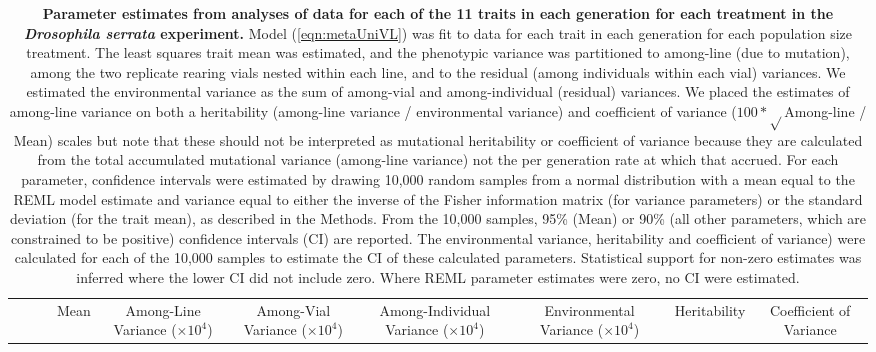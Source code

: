 \newpage
\FloatBarrier
\begin{landscape}
\begin{table}[!ht]
    \setlength\tabcolsep{0.3em}
    \tiny
    \caption[Parameter estimates from analyses of data for each of the 11 traits in each generation for each treatment in the \textit{Drosophila serrata} experiment.]{\textbf{Parameter estimates from analyses of data for each of the 11 traits in each generation for each treatment in the \textit{Drosophila serrata} experiment.} Model (\ref{eqn:metaUniVL}) was fit to data for each trait in each generation for each population size treatment. The least squares trait mean was estimated, and the phenotypic variance was partitioned to among-line (due to mutation), among the two replicate rearing vials nested within each line, and to the residual (among individuals within each vial) variances. We estimated the environmental variance as the sum of among-vial and among-individual (residual) variances. We placed the estimates of among-line variance on both a heritability (among-line variance / environmental variance) and coefficient of variance ($100* \sqrt{}$Among-line / Mean) scales but note that these should not be interpreted as mutational heritability or coefficient of variance because they are calculated from the total accumulated mutational variance (among-line variance) not the per generation rate at which that accrued. For each parameter, confidence intervals were estimated by drawing 10,000 random samples from a normal distribution with a mean equal to the REML model estimate and variance equal to either the inverse of the Fisher information matrix (for variance parameters) or the standard deviation (for the trait mean), as described in the Methods. From the 10,000 samples, 95\% (Mean) or 90\% (all other parameters, which are constrained to be positive) confidence intervals (CI) are reported. The environmental variance, heritability and coefficient of variance) were calculated for each of the 10,000 samples to estimate the CI of these calculated parameters. Statistical support for non-zero estimates was inferred where the lower CI did not include zero. Where REML parameter estimates were zero, no CI were estimated. }
    \label{tab:S4RegCoef}
        \centering
    \begin{tabular}{cccrlrlrlrlrlrlrl}
    \toprule
    	&&&	\multicolumn{2}{c}{Mean} & \multicolumn{2}{c}{Among-Line Variance ($\times10^4$)}&	\multicolumn{2}{c}{Among-Vial Variance ($\times10^4$)}& \multicolumn{2}{c}{Among-Individual Variance ($\times10^4$)} & \multicolumn{2}{c}{Environmental Variance ($\times10^4$)} & \multicolumn{2}{c}{Heritability} & \multicolumn{2}{c}{Coefficient of Variance}\\

\end{tabular}
\end{table}
\end{landscape}
